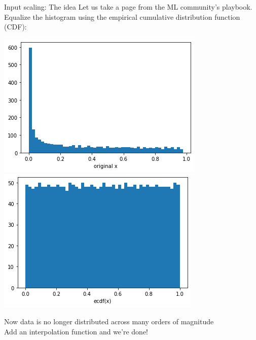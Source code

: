 \documentclass[aspectratio=169,11pt]{beamer}
\newcommand{\nn}{\vspace*{1em}}
\begin{document}
\begin{frame}[t]{Input scaling: The idea}
  Let us take a page from the ML community's playbook.\\
  Equalize the histogram using the empirical cumulative distribution function (CDF):
  \begin{center}
    \includegraphics[height=0.4\textheight]{figures/default_xgrid.png} \hspace*{1cm}
    \includegraphics[height=0.4\textheight]{figures/ecdf_xgrid.png}
  \end{center}
  Now data is no longer distributed across many orders of magnitude \\ \nn
  Add an interpolation function and we're done!
\end{frame}
\end{document}
